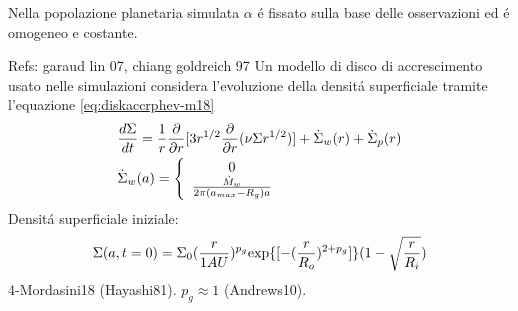 \begin{workout}
Nella popolazione planetaria simulata $\alpha$ \'e fissato sulla base delle osservazioni  ed \'e omogeneo e costante.
\end{workout}

\begin{workout}
Refs: garaud lin 07, chiang goldreich 97
Un modello di disco  di accrescimento usato nelle simulazioni considera l'evoluzione della densit\'a superficiale tramite l'equazione \eqref{eq:diskaccrphev-m18}
\begin{align}
&\frac{d \Sigma}{d t}=\frac{1}{r}\frac{\partial}{\partial r}[3r^{1/2}\frac{\partial}{\partial r}(\nu\Sigma r^{1/2})]+\dot{\Sigma}_w(r)+\dot{\Sigma}_p(r)\label{eq:diskaccrphev-m18}\\
&\dot{\Sigma}_w(a)=\left\{\begin{array}{c}0\\\frac{\dot{M}_w}{2\pi(a_{max}-R_g)a}\\\end{array}\right.
\end{align}
Densit\'a superficiale iniziale:
\begin{equation}
\Sigma(a,t=0)=\Sigma_0(\frac{r}{1AU})^{p_g}\text{exp}\{[-(\frac{r}{R_o})^{2+p_g}]\}(1-\sqrt{\frac{r}{R_i}})
\end{equation}
4-Mordasini18 (Hayashi81). $p_g\approx1$ (Andrews10).
\end{workout}

